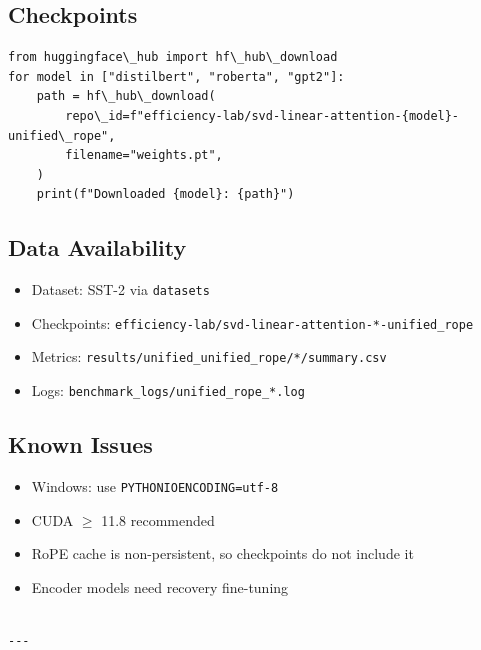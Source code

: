 \subsection{Checkpoints}

\begin{lstlisting}
from huggingface\_hub import hf\_hub\_download
for model in ["distilbert", "roberta", "gpt2"]:
    path = hf\_hub\_download(
        repo\_id=f"efficiency-lab/svd-linear-attention-{model}-unified\_rope",
        filename="weights.pt",
    )
    print(f"Downloaded {model}: {path}")
\end{lstlisting}

\subsection{Data Availability}

\begin{itemize}
\item Dataset: SST-2 via \texttt{datasets}
\item Checkpoints: \texttt{efficiency-lab/svd-linear-attention-*-unified\_rope}
\item Metrics: \texttt{results/unified\_unified\_rope/*/summary.csv}
\item Logs: \texttt{benchmark\_logs/unified\_rope\_*.log}

\end{itemize}
\subsection{Known Issues}

\begin{itemize}
\item Windows: use \texttt{PYTHONIOENCODING=utf-8}
\item CUDA $\ge$ 11.8 recommended
\item RoPE cache is non-persistent, so checkpoints do not include it
\item Encoder models need recovery fine-tuning
\end{itemize}
\begin{lstlisting}

---
\end{lstlisting}